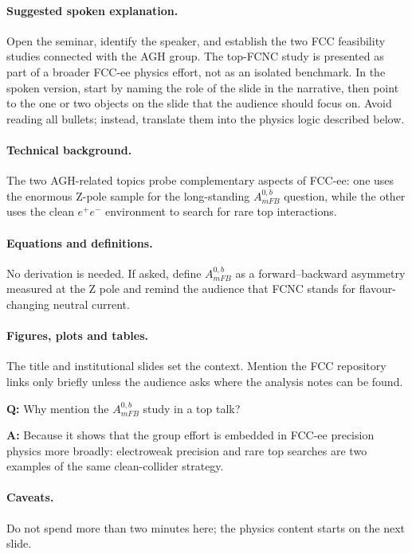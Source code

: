 \documentclass[11pt,a4paper]{report}
\newcommand{\ee}{e^+e^-}
\begin{document}
\paragraph{Suggested spoken explanation.}
Open the seminar, identify the speaker, and establish the two FCC feasibility studies connected with the AGH group. The top-FCNC study is presented as part of a broader FCC-ee physics effort, not as an isolated benchmark. In the spoken version, start by naming the role of the slide in the narrative, then point to the one or two objects on the slide that the audience should focus on.  Avoid reading all bullets; instead, translate them into the physics logic described below.

\paragraph{Technical background.}
The two AGH-related topics probe complementary aspects of FCC-ee: one uses the enormous Z-pole sample for the long-standing $A_{
m FB}^{0,b}$ question, while the other uses the clean $\ee$ environment to search for rare top interactions.

\paragraph{Equations and definitions.}
No derivation is needed.  If asked, define $A_{
m FB}^{0,b}$ as a forward--backward asymmetry measured at the Z pole and remind the audience that FCNC stands for flavour-changing neutral current.

\paragraph{Figures, plots and tables.}
The title and institutional slides set the context.  Mention the FCC repository links only briefly unless the audience asks where the analysis notes can be found.

\begin{questionbox}
\textbf{Q:} Why mention the $A_{
m FB}^{0,b}$ study in a top talk?\par
\textbf{A:} Because it shows that the group effort is embedded in FCC-ee precision physics more broadly: electroweak precision and rare top searches are two examples of the same clean-collider strategy.
\end{questionbox}

\paragraph{Caveats.}
Do not spend more than two minutes here; the physics content starts on the next slide.
\end{document}
